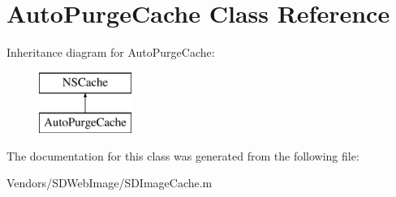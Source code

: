 \hypertarget{interface_auto_purge_cache}{}\section{Auto\+Purge\+Cache Class Reference}
\label{interface_auto_purge_cache}
Inheritance diagram for Auto\+Purge\+Cache\+:\begin{figure}[H]
\begin{center}
\leavevmode
\includegraphics[height=2.000000cm]{interface_auto_purge_cache}
\end{center}
\end{figure}


The documentation for this class was generated from the following file\+:\begin{DoxyCompactItemize}
\item 
Vendors/\+S\+D\+Web\+Image/S\+D\+Image\+Cache.\+m\end{DoxyCompactItemize}
